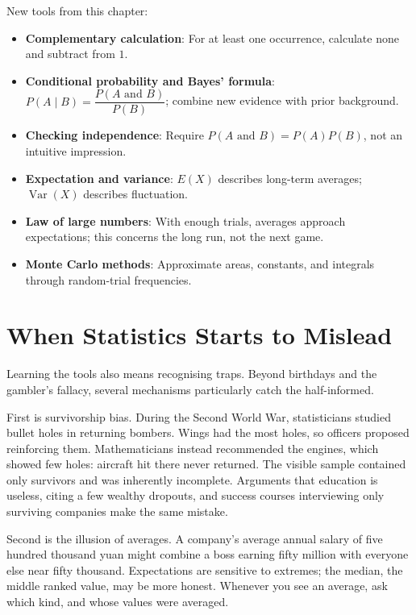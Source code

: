 \begin{toolbox}
New tools from this chapter:
\begin{itemize}
  \item \textbf{Complementary calculation}: For at least one occurrence, calculate none and subtract from $1$.
  \item \textbf{Conditional probability and Bayes' formula}: $P(A\mid B)=\dfrac{P(A\text{ and }B)}{P(B)}$; combine new evidence with prior background.
  \item \textbf{Checking independence}: Require $P(A\text{ and }B)=P(A)P(B)$, not an intuitive impression.
  \item \textbf{Expectation and variance}: $E(X)$ describes long-term averages; $\operatorname{Var}(X)$ describes fluctuation.
  \item \textbf{Law of large numbers}: With enough trials, averages approach expectations; this concerns the long run, not the next game.
  \item \textbf{Monte Carlo methods}: Approximate areas, constants, and integrals through random-trial frequencies.
\end{itemize}
\end{toolbox}

\section{When Statistics Starts to Mislead}

Learning the tools also means recognising traps. Beyond birthdays and the gambler's fallacy, several mechanisms particularly catch the half-informed.

First is survivorship bias. During the Second World War, statisticians studied bullet holes in returning bombers. Wings had the most holes, so officers proposed reinforcing them. Mathematicians instead recommended the engines, which showed few holes: aircraft hit there never returned. The visible sample contained only survivors and was inherently incomplete. Arguments that education is useless, citing a few wealthy dropouts, and success courses interviewing only surviving companies make the same mistake.

Second is the illusion of averages. A company's average annual salary of five hundred thousand yuan might combine a boss earning fifty million with everyone else near fifty thousand. Expectations are sensitive to extremes; the median, the middle ranked value, may be more honest. Whenever you see an average, ask which kind, and whose values were averaged.

